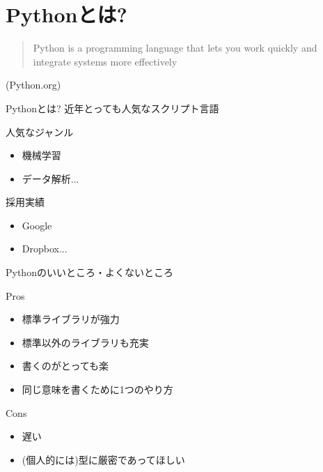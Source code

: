 \documentclass[12pt, dvipdfmx]{beamer}
\begin{document}
\section{Pythonとは?}
\begin{frame}
    \begin{quote}
        Python is a programming language that lets you work quickly and integrate systems more effectively
    \end{quote}
    \begin{flushright}
        (Python.org)
    \end{flushright}
\end{frame}
\begin{frame}{Pythonとは?}
    近年とっても人気なスクリプト言語

    \pause
    \begin{block}{人気なジャンル}
        \begin{itemize}
            \item 機械学習
            \item データ解析...
        \end{itemize}
    \end{block}

    \begin{block}{採用実績}
        \begin{itemize}
            \item Google
            \item Dropbox...
        \end{itemize}
    \end{block}
\end{frame}
\begin{frame}{Pythonのいいところ・よくないところ}
    \begin{alertblock}{Pros}
        \begin{itemize}
            \item 標準ライブラリが強力
            \item 標準以外のライブラリも充実
            \item 書くのがとっても楽
            \item 同じ意味を書くために1つのやり方
        \end{itemize}
    \end{alertblock}
    \begin{block}{Cons}
        \begin{itemize}
            \item 遅い
            \item (個人的には)型に厳密であってほしい    
        \end{itemize}
    \end{block}
\end{frame}
\end{document}
